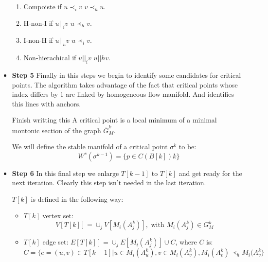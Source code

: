 \begin{itemize}
\begin{enumerate}
            \item Compoiste if $u\prec_{i}v$  $v\prec_{h}u$.

            \item H-non-I if $u\vert\vert_i v$  $u\prec_{h}v$.

            \item I-non-H if $u\vert\vert_h v$  $u\prec_{i}v$.

            \item Non-hierachical if $u\vert\vert_i v$  $u\vert\vert{h}v$.
        \end{enumerate}
    \item {\bf Step 5}
        Finally in this steps we begin to identify some candidates for critical points.
        The algorithm takes advantage of the fact that critical points whose index differs by $1$ are linked by homogeneous 
        flow manifold. 
        And identifies this lines with anchors.

        \begin{definition}
            {\color{red} Finish writting this}
            A critical point is a local minimum of a minimal montonic section of the graph 
            $\overbar G_M^k$.
            
            We will define the stable manifold of a critical point $\sigma^k$ to be:
            $$
            W^s(\sigma^{k-1})
            =
            \{
                p\in C(B[k])k
            \}
            $$
        \end{definition}

    \item {\bf Step 6}
        In this final step we enlarge $T[k-1]$ to $T[k]$ and get ready for the next iteration.
        Clearly this step isn't needed in the last iteration.
        
        $T[k]$ is defined in the following way:

        \begin{itemize}
            \item $T[k]$ vertex set:
                $$
                V[T[k]]=
                \cup_j V[M_i(A_j^k)], \text{ with } M_i(A_j^k)\in G_M^k
                $$
            \item $T[k]$ edge set:
                $E[T[k]]=\cup_j E[M_i(A_j^k)]\cup C$, where $C$ is:
                $$
                C=\{
                    e=(u,v)\in T[k-1]\vert
                    u\in M_i(A_u^k),
                    v\in M_i(A_v^k),
                     M_i(A_v^k) \prec_h M_i(A_v^k
                \}
                $$
        \end{itemize}

\end{itemize}

